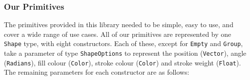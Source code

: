 \documentclass[../main.tex]{subfiles}
\begin{document}
            \subsubsection{Our Primitives}
                The primitives provided in this library needed to be simple, easy to use, and
                    cover a wide range of use cases.
                All of our primitives are represented by one \texttt{Shape} type, with eight
                    constructors.
                Each of these, except for \texttt{Empty} and \texttt{Group}, take a parameter
                    of type \texttt{ShapeOptions} to represent the position (\texttt{Vector}),
                    angle (\texttt{Radians}), fill colour (\texttt{Color}), stroke colour
                    (\texttt{Color}) and stroke weight (\texttt{Float}).
                The remaining parameters for each constructor are as follows:
\end{document}
